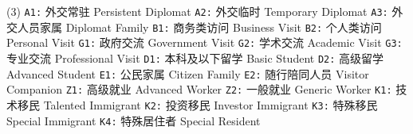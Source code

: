 \documentclass[a4paper,10pt]{article}
\begin{document}
\begin{tasks}[label=,after-item-skip=0pt,item-indent=0pt](3)
	\task \texttt{A1:} 外交常驻 Persistent Diplomat
	\task \texttt{A2:} 外交临时 Temporary Diplomat
	\task \texttt{A3:} 外交人员家属 Diplomat Family
	\task \texttt{B1:} 商务类访问 Business Visit
	\task \texttt{B2:} 个人类访问 Personal Visit
	\task \texttt{G1:} 政府交流 Government Visit
	\task \texttt{G2:} 学术交流 Academic Visit
	\task \texttt{G3:} 专业交流 Professional Visit
	\task \texttt{D1:} 本科及以下留学 Basic Student
	\task \texttt{D2:} 高级留学 Advanced Student
	\task \texttt{E1:} 公民家属 Citizen Family
	\task \texttt{E2:} 随行陪同人员 Visitor Companion
	\task \texttt{Z1:} 高级就业 Advanced Worker
	\task \texttt{Z2:} 一般就业 Generic Worker
	\task \texttt{K1:} 技术移民 Talented Immigrant
	\task \texttt{K2:} 投资移民 Investor Immigrant
	\task \texttt{K3:} 特殊移民 Special Immigrant
	\task \texttt{K4:} 特殊居住者 Special Resident
\end{tasks}

\end{document}

